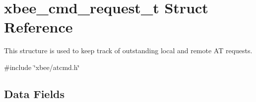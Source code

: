 \hypertarget{structxbee__cmd__request__t}{}\section{xbee\+\_\+cmd\+\_\+request\+\_\+t Struct Reference}
\label{structxbee__cmd__request__t}


This structure is used to keep track of outstanding local and remote AT requests.  




{\ttfamily \#include \char`\"{}xbee/atcmd.\+h\char`\"{}}

\subsection*{Data Fields}
